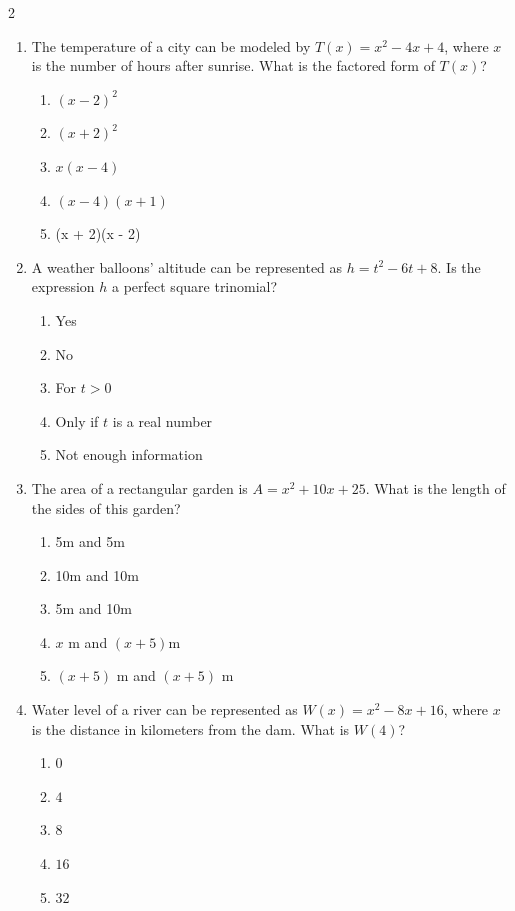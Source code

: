 \documentclass[10pt]{article}
\begin{document}
\begin{multicols}{2}
\begin{enumerate}[label=\textbf{Q\arabic*.}, leftmargin=*, itemsep=6pt, parsep=0pt]
  \item \small The temperature of a city can be modeled by $T(x) = x^2 - 4x + 4$, where $x$ is the number of hours after sunrise. What is the factored form of $T(x)$?
  \begin{enumerate}[label=(\Alph*), leftmargin=0.6cm, nosep, itemsep=2pt]
    \item $(x - 2)^2$
    \item $(x + 2)^2$
    \item $x(x - 4)$
    \item $(x - 4)(x + 1)$
    \item (x + 2)(x - 2)
  \end{enumerate}

  \item \small A weather balloons' altitude can be represented as $h = t^2 - 6t + 8$. Is the expression $h$ a perfect square trinomial?
  \begin{enumerate}[label=(\Alph*), leftmargin=0.6cm, nosep, itemsep=2pt]
    \item Yes
    \item No
    \item For $t > 0$
    \item Only if $t$ is a real number
    \item Not enough information
  \end{enumerate}

  \item \small The area of a rectangular garden is $A = x^2 + 10x + 25$. What is the length of the sides of this garden?
  \begin{enumerate}[label=(\Alph*), leftmargin=0.6cm, nosep, itemsep=2pt]
    \item 5m and 5m
    \item 10m and 10m
    \item 5m and 10m
    \item $x$ m and $(x + 5)$m
    \item $(x + 5)$ m and $(x + 5)$ m
  \end{enumerate}

  \item \small Water level of a river can be represented as $W(x) = x^2 - 8x + 16$, where $x$ is the distance in kilometers from the dam. What is $W(4)$?
  \begin{enumerate}[label=(\Alph*), leftmargin=0.6cm, nosep, itemsep=2pt]
    \item $0$
    \item $4$
    \item $8$
    \item $16$
    \item $32$
  \end{enumerate}


\end{enumerate}
\end{multicols}
\end{document}
